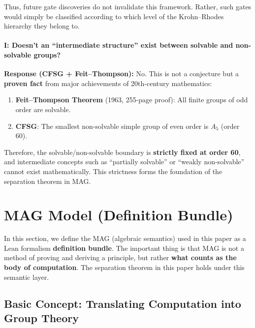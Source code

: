 \documentclass[11pt,a4paper]{article}
\theoremstyle{plain}
\theoremstyle{definition}
\newcommand{\Aalt}{A_5}
\begin{document}
Thus, future gate discoveries do not invalidate this framework. Rather, such gates would simply be classified according to which level of the Krohn--Rhodes hierarchy they belong to.

\paragraph{I: Doesn't an ``intermediate structure'' exist between solvable and non-solvable groups?}
\textbf{Response (CFSG + Feit--Thompson):} No. This is not a conjecture but a \textbf{proven fact} from major achievements of 20th-century mathematics:

\begin{enumerate}[nosep]
\item \textbf{Feit--Thompson Theorem} (1963, 255-page proof): All finite groups of odd order are solvable.
\item \textbf{CFSG}: The smallest non-solvable simple group of even order is $\Aalt$ (order 60).
\end{enumerate}

Therefore, the solvable/non-solvable boundary is \textbf{strictly fixed at order 60}, and intermediate concepts such as ``partially solvable'' or ``weakly non-solvable'' cannot exist mathematically. This strictness forms the foundation of the separation theorem in MAG.



\section{MAG Model (Definition Bundle)}

In this section, we define the MAG (algebraic semantics) used in this paper as a Lean formalism \textbf{definition bundle}. The important thing is that MAG is not a method of proving and deriving a principle, but rather \textbf{what counts as the body of computation}. The separation theorem in this paper holds under this semantic layer.

\subsection{Basic Concept: Translating Computation into Group Theory}
\end{document}
